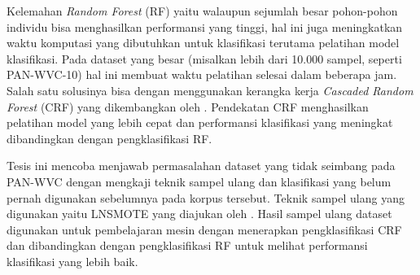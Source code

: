 Kelemahan \textit{Random Forest} (RF) yaitu walaupun sejumlah besar pohon-pohon
individu bisa menghasilkan performansi yang tinggi, hal ini juga meningkatkan
waktu komputasi yang dibutuhkan untuk klasifikasi terutama pelatihan
model klasifikasi.
Pada dataset yang besar (misalkan lebih dari 10.000 sampel, seperti
PAN-WVC-10) hal ini membuat waktu pelatihan selesai dalam beberapa jam.
Salah satu solusinya bisa dengan menggunakan kerangka kerja
\textit{Cascaded Random Forest} (CRF)
yang dikembangkan oleh
\textcite{baumann2013cascaded}.
Pendekatan CRF menghasilkan pelatihan model yang lebih cepat dan performansi
klasifikasi yang meningkat dibandingkan dengan pengklasifikasi RF.

Tesis ini mencoba menjawab permasalahan dataset yang tidak seimbang pada
PAN-WVC dengan mengkaji teknik sampel ulang dan klasifikasi yang belum pernah
digunakan sebelumnya pada korpus tersebut.
Teknik sampel ulang yang digunakan yaitu LNSMOTE yang diajukan oleh
\textcite{maciejewski2011local}.
Hasil sampel ulang dataset digunakan untuk pembelajaran mesin dengan menerapkan
pengklasifikasi CRF dan dibandingkan dengan pengklasifikasi RF untuk melihat
performansi klasifikasi yang lebih baik.
